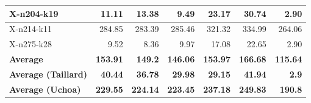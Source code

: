 \documentclass[12pt,a4paper,oneside]{book}
\begin{document}
\begin{table}[]
\begin{tabular}{|l|r|r|r|r|r|r|}
X-n204-k19               & 11.11           & 13.38           & 9.49            & 23.17           & 30.74           & 2.90             \\ \hline
X-n214-k11               & 284.85          & 283.39          & 285.46          & 321.32          & 334.99          & 264.06          \\ \hline
X-n275-k28               & 9.52            & 8.36            & 9.97            & 17.08           & 22.65           & 2.90             \\ \hline
\textbf{Average}         & \textbf{153.91} & \textbf{149.2}  & \textbf{146.06} & \textbf{153.97} & \textbf{166.68} & \textbf{115.64} \\ \hline
\textbf{Average (Taillard)}   & \textbf{40.44}  & \textbf{36.78}  & \textbf{29.98}  & \textbf{29.15}  & \textbf{41.94}  & \textbf{2.9}    \\ \hline
\textbf{Average (Uchoa)} & \textbf{229.55} & \textbf{224.14} & \textbf{223.45} & \textbf{237.18} & \textbf{249.83} & \textbf{190.8}  \\ \hline
\end{tabular}
\end{table}
\end{document}

